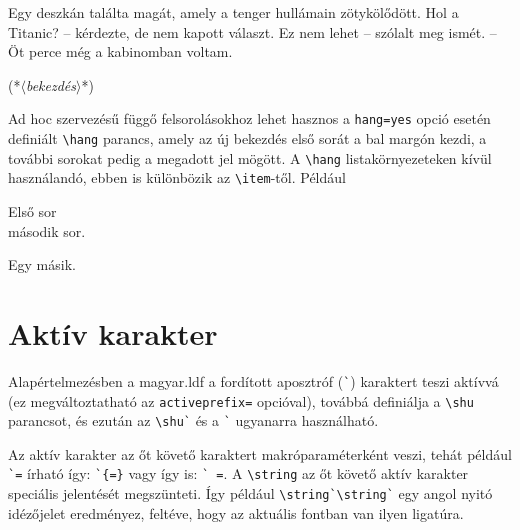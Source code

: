 \documentclass[12pt]{article}
\newcommand\param[1]{{\normalfont\slshape$\langle$#1$\rangle$}}
\newlength{\exampleparindent}
\def\latexexampleparindent{\setlength{\exampleparindent}{10pt}}
\begin{document}
\latexexampleparindent
\begin{latexexample}
Egy deszkán találta magát,
amely a tenger hullámain
zötykölődött.
\mond Hol a Titanic? -- kérdezte,
de nem kapott választ.
\mond Ez nem lehet -- szólalt
meg ismét. -- Öt perce még a
kabinomban voltam.
\end{latexexample}

\begin{latexcode}
\hang{(*\param{bekezdéskezdő jel}*)}(*\param{bekezdés}*)
\end{latexcode}
Ad hoc szervezésű függő felsorolásokhoz lehet hasznos a \texttt{hang=yes} opció esetén definiált \verb|\hang| parancs, amely az új bekezdés első sorát a bal margón kezdi, a további sorokat pedig a megadott jel mögött.
A \verb|\hang| listakörnyezeteken kívül használandó, ebben is különbözik az \verb|\item|-től.
Például

\begin{latexexample}
\hang{-- }Első sor\\
második sor.\par
\hang{$\bullet\circ$ }Egy másik.
\end{latexexample}

\section{Aktív karakter}\label{sec-aktiv}

Alapértelmezésben a \textsf{magyar.ldf} a fordított aposztróf (\verb|`|) karaktert teszi aktívvá (ez megváltoztatható az \texttt{activeprefix=} opcióval), továbbá definiálja a \verb|\shu| parancsot, és ezután az \verb|\shu`| és a \verb|`| ugyanarra használható.

Az aktív karakter az őt követő karaktert makróparaméterként veszi, tehát például \verb|`=| írható így: \verb|`{=}| vagy így is: \verb*|` =|. 
A \verb|\string| az őt követő aktív karakter speciális jelentését megszünteti.
Így például \verb|\string`\string`| egy angol nyitó idézőjelet eredményez, feltéve, hogy az aktuális fontban van ilyen ligatúra.
\end{document}
